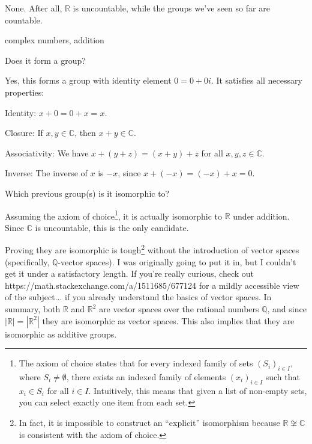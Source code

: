 \documentclass[../key.tex]{subfiles}
\begin{document}
\noindent None. After all, $\mathbb{R}$ is uncountable, while the groups we've seen so far are countable.

\begin{inner_problem}
\item complex numbers, addition
\end{inner_problem}

\begin{iinner_problem}[start=1]
\item Does it form a group?
\end{iinner_problem}

\noindent Yes, this forms a group with identity element $0=0+0i$. It satisfies all necessary properties:

Identity: $x+0=0+x=x$.

Closure: If $x,y\in \mathbb{C}$, then $x+y\in \mathbb{C}$.

Associativity: We have $x+(y+z)=(x+y)+z$ for all $x,y,z \in \mathbb{C}$.

Inverse: The inverse of $x$ is $-x$, since $x+(-x)=(-x)+x=0$.

\begin{iinner_problem}
\item Which previous group(s) is it isomorphic to?
\end{iinner_problem}

\noindent Assuming the axiom of choice\footnote{The axiom of choice states that for every indexed family of sets $(S_i)_{i\in I}$, where $S_i\neq \emptyset$, there exists an indexed family of elements $(x_i)_{i\in I}$  such that $x_i\in S_i$ for all $i\in I$. Intuitively, this means that given a list of non-empty sets, you can select exactly one item from each set.}, it is actually isomorphic to $\mathbb{R}$ under addition. Since $\mathbb{C}$ is uncountable, this is the only candidate.

Proving they are isomorphic is tough\footnote{In fact, it is impossible to construct an ``explicit'' isomorphism because $\mathbb{R} \not \cong \mathbb{C}$ is consistent with the axiom of choice.} without the introduction of vector spaces (specifically, $\mathbb{Q}$-vector spaces). I was originally going to put it in, but I couldn't get it under a satisfactory length. If you're really curious, check out https://math.stackexchange.com/a/1511685/677124 for a mildly accessible view of the subject... if you already understand the basics of vector spaces. In summary, both $\mathbb{R}$ and $\mathbb{R}^2$ are vector spaces over the rational numbers $\mathbb{Q}$, and since $|\mathbb{R}|=|\mathbb{R}^2|$ they are isomorphic as vector spaces. This also implies that they are isomorphic as additive groups.
\end{document}
